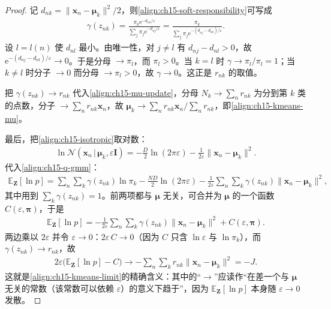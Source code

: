 \documentclass[../../main.tex]{subfiles}
\begin{document}
\begin{proof}
记 $d_{nk}=\|\bm{x}_n-\bm{\mu}_k\|^{2}/2$，则\eqref{align:ch15-soft-responsibility}可写成
\begin{align*}
\gamma(z_{nk})=\frac{\pi_k\mathrm{e}^{-d_{nk}/\varepsilon}}{\sum_j\pi_j\mathrm{e}^{-d_{nj}/\varepsilon}}
=\frac{\pi_k}{\sum_j\pi_j\mathrm{e}^{-(d_{nj}-d_{nk})/\varepsilon}}.
\end{align*}
设 $l=l(n)$ 使 $d_{nl}$ 最小。由唯一性，对 $j\neq l$ 有 $d_{nj}-d_{nl}>0$，故 $\mathrm{e}^{-(d_{nj}-d_{nl})/\varepsilon}\to0$。于是分母 $\to\pi_l$，而 $\pi_l>0$。当 $k=l$ 时 $\gamma\to\pi_l/\pi_l=1$；当 $k\neq l$ 时分子 $\to0$ 而分母 $\to\pi_l>0$，故 $\gamma\to0$。这正是 $r_{nk}$ 的取值。

把 $\gamma(z_{nk})\to r_{nk}$ 代入\eqref{align:ch15-mu-update}，分母 $N_k\to\sum_nr_{nk}$ 为分到第 $k$ 类的点数，分子 $\to\sum_nr_{nk}\bm{x}_n$，故 $\bm{\mu}_k\to\sum_nr_{nk}\bm{x}_n/\sum_nr_{nk}$，即\eqref{align:ch15-kmeans-mu}。

最后，把\eqref{align:ch15-isotropic}取对数：
\begin{align*}
\ln\mathcal{N}(\bm{x}_n\,|\,\bm{\mu}_k,\varepsilon\bm{I})=-\frac{D}{2}\ln(2\pi\varepsilon)-\frac{1}{2\varepsilon}\|\bm{x}_n-\bm{\mu}_k\|^{2}.
\end{align*}
代入\eqref{align:ch15-q-gmm}：
\begin{align*}
\mathbb{E}_{\bm{Z}}[\ln p]
=\sum_{n}\sum_{k}\gamma(z_{nk})\ln\pi_k-\frac{ND}{2}\ln(2\pi\varepsilon)-\frac{1}{2\varepsilon}\sum_{n}\sum_{k}\gamma(z_{nk})\|\bm{x}_n-\bm{\mu}_k\|^{2},
\end{align*}
其中用到 $\sum_k\gamma(z_{nk})=1$。前两项都与 $\bm{\mu}$ 无关，可合并为 $\bm{\mu}$ 的一个函数 $C(\varepsilon,\bm{\pi})$，于是
\begin{align*}
\mathbb{E}_{\bm{Z}}[\ln p]=-\frac{1}{2\varepsilon}\sum_{n}\sum_{k}\gamma(z_{nk})\|\bm{x}_n-\bm{\mu}_k\|^{2}+C(\varepsilon,\bm{\pi}).
\end{align*}
两边乘以 $2\varepsilon$ 并令 $\varepsilon\to0$：$2\varepsilon\,C\to0$（因为 $C$ 只含 $\ln\varepsilon$ 与 $\ln\pi_k$），而 $\gamma(z_{nk})\to r_{nk}$，故
\begin{align*}
2\varepsilon\big(\mathbb{E}_{\bm{Z}}[\ln p]-C\big)\longrightarrow-\sum_{n}\sum_{k}r_{nk}\|\bm{x}_n-\bm{\mu}_k\|^{2}=-J.
\end{align*}
这就是\eqref{align:ch15-kmeans-limit}的精确含义：其中的“$\to$”应读作“在差一个与 $\bm{\mu}$ 无关的常数（该常数可以依赖 $\varepsilon$）的意义下趋于”，因为 $\mathbb{E}_{\bm{Z}}[\ln p]$ 本身随 $\varepsilon\to0$ 发散。
\end{proof}
\end{document}
